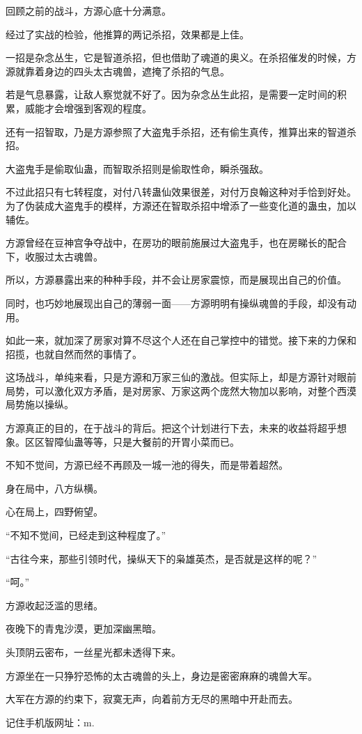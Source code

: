 \begin{this_body}
回顾之前的战斗，方源心底十分满意。

经过了实战的检验，他推算的两记杀招，效果都是上佳。

一招是杂念丛生，它是智道杀招，但也借助了魂道的奥义。在杀招催发的时候，方源就靠着身边的四头太古魂兽，遮掩了杀招的气息。

若是气息暴露，让敌人察觉就不好了。因为杂念丛生此招，是需要一定时间的积累，威能才会增强到客观的程度。

还有一招智取，乃是方源参照了大盗鬼手杀招，还有偷生真传，推算出来的智道杀招。

大盗鬼手是偷取仙蛊，而智取杀招则是偷取性命，瞬杀强敌。

不过此招只有七转程度，对付八转蛊仙效果很差，对付万良翰这种对手恰到好处。为了伪装成大盗鬼手的模样，方源还在智取杀招中增添了一些变化道的蛊虫，加以辅佐。

方源曾经在豆神宫争夺战中，在房功的眼前施展过大盗鬼手，也在房睇长的配合下，收服过太古魂兽。

所以，方源暴露出来的种种手段，并不会让房家震惊，而是展现出自己的价值。

同时，也巧妙地展现出自己的薄弱一面——方源明明有操纵魂兽的手段，却没有动用。

如此一来，就加深了房家对算不尽这个人还在自己掌控中的错觉。接下来的力保和招揽，也就自然而然的事情了。

这场战斗，单纯来看，只是方源和万家三仙的激战。但实际上，却是方源针对眼前局势，可以激化双方矛盾，是对房家、万家这两个庞然大物加以影响，对整个西漠局势施以操纵。

方源真正的目的，在于战斗的背后。把这个计划进行下去，未来的收益将超乎想象。区区智障仙蛊等等，只是大餐前的开胃小菜而已。

不知不觉间，方源已经不再顾及一城一池的得失，而是带着超然。

身在局中，八方纵横。

心在局上，四野俯望。

“不知不觉间，已经走到这种程度了。”

“古往今来，那些引领时代，操纵天下的枭雄英杰，是否就是这样的呢？”

“呵。”

方源收起泛滥的思绪。

夜晚下的青鬼沙漠，更加深幽黑暗。

头顶阴云密布，一丝星光都未透得下来。

方源坐在一只狰狞恐怖的太古魂兽的头上，身边是密密麻麻的魂兽大军。

大军在方源的约束下，寂寞无声，向着前方无尽的黑暗中开赴而去。

记住手机版网址：m.

\end{this_body}

